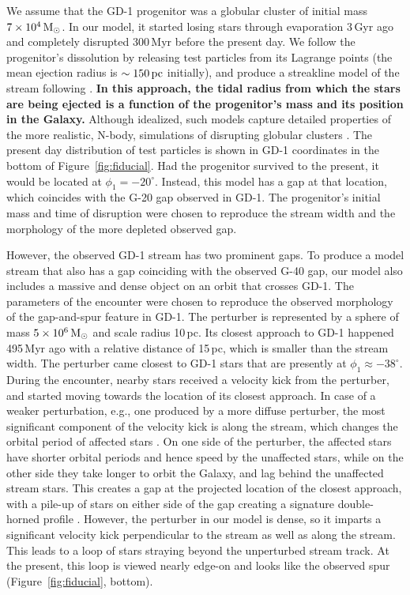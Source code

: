 \documentclass[twocolumn]{aastex62}
\newcommand{\changes}[1]{{\textbf{#1}}}
\begin{document}
We assume that the GD-1 progenitor was a globular cluster of initial mass $7\times10^4\rm\,M_\odot$.
In our model, it started losing stars through evaporation 3\,Gyr ago and completely disrupted 300\,Myr before the present day.
We follow the progenitor's dissolution by releasing test particles from its Lagrange points (the mean ejection radius is $\sim150\,\rm pc$ initially), and produce a streakline model of the stream following \citet{fardal2015}.
\changes{In this approach, the tidal radius from which the stars are being ejected is a function of the progenitor's mass and its position in the Galaxy.}
Although idealized, such models capture detailed properties of the more realistic, N-body, simulations of disrupting globular clusters \citep{kupper2012}.
The present day distribution of test particles is shown in GD-1 coordinates in the bottom of Figure~\ref{fig:fiducial}.
Had the progenitor survived to the present, it would be located at $\phi_1=-20^\circ$.
Instead, this model has a gap at that location, which coincides with the G-20 gap observed in GD-1.
The progenitor's initial mass and time of disruption were chosen to reproduce the stream width and the morphology of the more depleted observed gap.

However, the observed GD-1 stream has two prominent gaps.
To produce a model stream that also has a gap coinciding with the observed G-40 gap, our model also includes a massive and dense object on an orbit that crosses GD-1.
The parameters of the encounter were chosen to reproduce the observed morphology of the gap-and-spur feature in GD-1.
The perturber is represented by a \citet{hernquist1990} sphere of mass $5\times10^6\rm\,M_\odot$ and scale radius 10\,pc.
Its closest approach to GD-1 happened 495\,Myr ago with a relative distance of 15\,pc, which is smaller than the stream width.
The perturber came closest to GD-1 stars that are presently at $\phi_1\approx-38^\circ$.
During the encounter, nearby stars received a velocity kick from the perturber, and started moving towards the location of its closest approach.
In case of a weaker perturbation, e.g., one produced by a more diffuse perturber, the most significant component of the velocity kick is along the stream, which changes the orbital period of affected stars \citep{eb2015}.
On one side of the perturber, the affected stars have shorter orbital periods and hence speed by the unaffected stars, while on the other side they take longer to orbit the Galaxy, and lag behind the unaffected stream stars.
This creates a gap at the projected location of the closest approach, with a pile-up of stars on either side of the gap creating a signature double-horned profile \citep{carlberg2012}.
However, the perturber in our model is dense, so it imparts a significant velocity kick perpendicular to the stream as well as along the stream.
This leads to a loop of stars straying beyond the unperturbed stream track.
At the present, this loop is viewed nearly edge-on and looks like the observed spur (Figure~\ref{fig:fiducial}, bottom).
\end{document}

